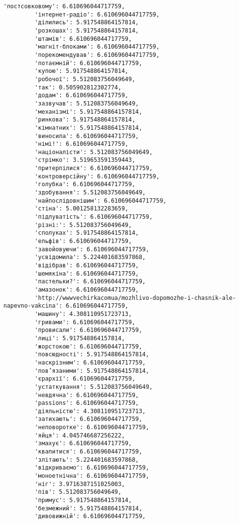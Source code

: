 \documentclass[11pt]{article}
\begin{document}
\begin{Verbatim}[commandchars=\\\{\}]
         'постсовковому': 6.610696044717759,
         'інтернет-радіо': 6.610696044717759,
         'ділились': 5.917548864157814,
         'розкошах': 5.917548864157814,
         'штамів': 6.610696044717759,
         'магніт-блоками': 6.610696044717759,
         'порекомендував': 6.610696044717759,
         'потаємній': 6.610696044717759,
         'купою': 5.917548864157814,
         'робочої': 5.512083756049649,
         'так': 0.505902812302774,
         'додам': 6.610696044717759,
         'зазвучав': 5.512083756049649,
         'механізмі': 5.917548864157814,
         'ринкова': 5.917548864157814,
         'кімнатних': 5.917548864157814,
         'виносила': 6.610696044717759,
         'німі!': 6.610696044717759,
         'націоналісти': 5.512083756049649,
         'стрімко': 3.519653591359443,
         'притерпілися': 6.610696044717759,
         'контроверсійну': 6.610696044717759,
         'голубка': 6.610696044717759,
         'здобування': 5.512083756049649,
         'найпослідовнішим': 6.610696044717759,
         'стіна': 5.001258132283659,
         'підлуватість': 6.610696044717759,
         'різні:': 5.512083756049649,
         'сполуках': 5.917548864157814,
         'ельфів': 6.610696044717759,
         'завойовуючи': 6.610696044717759,
         'усвідомила': 5.224401683597868,
         'відібрав': 6.610696044717759,
         'шемякіна': 6.610696044717759,
         'пастельки?': 6.610696044717759,
         'амазонок': 6.610696044717759,
         'http://wwwvechirkacomua/mozhlivo-dopomozhe-i-chasnik-ale-napevno-vakcina': 6.610696044717759,
         'машину': 4.308110951723713,
         'гривами': 6.610696044717759,
         'провисали': 6.610696044717759,
         'лиці': 5.917548864157814,
         'жорстокою': 6.610696044717759,
         'повсюдності': 5.917548864157814,
         'наскрізним': 6.610696044717759,
         'пов’язаними': 5.917548864157814,
         'єрархії': 6.610696044717759,
         'устаткування': 5.512083756049649,
         'невдячна': 6.610696044717759,
         'passions': 6.610696044717759,
         'діяльністю': 4.308110951723713,
         'затихають': 6.610696044717759,
         'неповоротке': 6.610696044717759,
         'яйця': 4.045746687256222,
         'змахує': 6.610696044717759,
         'квапитися': 6.610696044717759,
         'злітають': 5.224401683597868,
         'відкриваємо': 6.610696044717759,
         'моноетнічна': 6.610696044717759,
         'ніг': 3.9716387151025003,
         'пів': 5.512083756049649,
         'примус': 5.917548864157814,
         'безмежний': 5.917548864157814,
         'дивовижній': 6.610696044717759,

\end{Verbatim}
\end{document}
